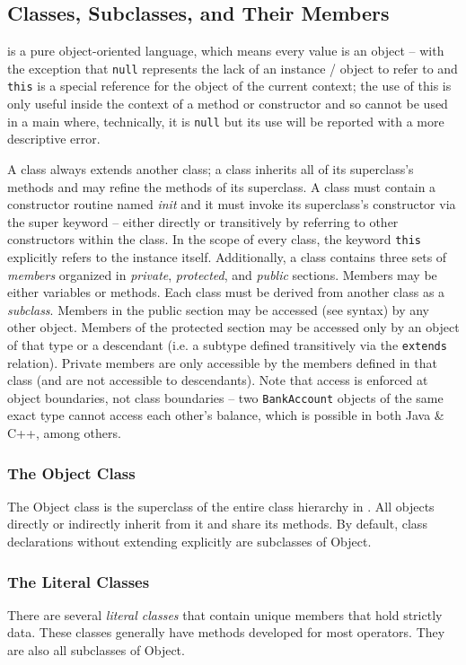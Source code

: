 \subsection{Classes, Subclasses, and Their Members}
\Lang{} is a pure object-oriented language, which means every value is an object -- with the exception that \verb!null! represents the lack of an instance / object to refer to and \verb!this! is a special reference for the object of the current context; the use of this is only useful inside the context of a method or constructor and so cannot be used in a main where, technically, it is \verb!null! but its use will be reported with a more descriptive error.

A class always extends another class; a class inherits all of its superclass's methods and may refine the methods of its superclass. A class must contain a constructor routine named \textit{init} and it must invoke its superclass's constructor via the super keyword -- either directly or transitively by referring to other constructors within the class. In the scope of every class, the keyword \verb!this! explicitly refers to the instance itself. Additionally, a class contains three sets of \textit{members} organized in \textit{private}, \textit{protected}, and \textit{public} sections. Members may be either variables or methods. Each class must be derived from another class as a \textit{subclass}. Members in the public section may be accessed (see syntax) by any other object. Members of the protected section may be accessed only by an object of that type or a descendant (i.e. a subtype defined transitively via the \verb!extends! relation). Private members are only accessible by the members defined in that class (and are not accessible to descendants). Note that access is enforced at object boundaries, not class boundaries -- two \verb!BankAccount! objects of the same exact type cannot access each other's balance, which is possible in both Java \& C++, among others.

\subsubsection{The Object Class}
The Object class is the superclass of the entire class hierarchy in \Lang{}. All objects directly or indirectly inherit from it and share its methods. By default, class declarations without extending explicitly are subclasses of Object.

\subsubsection{The Literal Classes}
There are several \textit{literal classes} that contain unique members that hold strictly data. These classes generally have methods developed for most operators. They are also all subclasses of Object.

